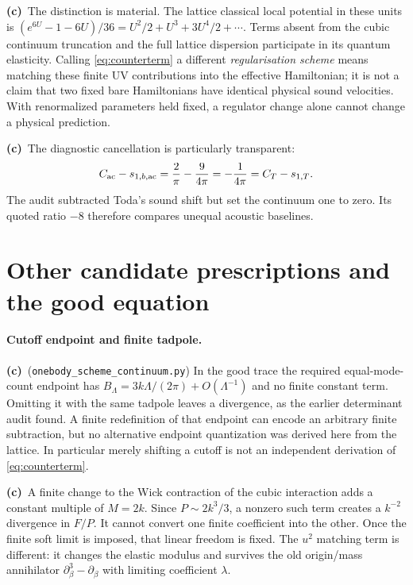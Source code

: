 \documentclass[11pt,a4paper]{article}
\newcommand{\Lc}{\textbf{(c)}\ }
\newcommand{\ccheck}{\texttt{onebody\_\allowbreak scheme\_\allowbreak continuum.py}}
\begin{document}
\Lc The distinction is material. The lattice classical local potential
in these units is
$(e^{6U}-1-6U)/36=U^2/2+U^3+3U^4/2+\cdots$.
Terms absent from the cubic continuum truncation and the full lattice
dispersion participate in its quantum elasticity. Calling
\eqref{eq:counterterm} a different \emph{regularisation scheme} means
matching these finite UV contributions into the effective Hamiltonian;
it is not a claim that two fixed bare Hamiltonians have identical physical
sound velocities. With renormalized parameters held fixed, a regulator
change alone cannot change a physical prediction.

\Lc The diagnostic cancellation is particularly transparent:
\begin{equation}\label{eq:soundsubtract}
 C_{\rm ac}-s_{1,b,\rm ac}
 =\frac2\pi-\frac9{4\pi}=-\frac1{4\pi}
 =C_T-s_{1,T}.
\end{equation}
The audit subtracted Toda's sound shift but set the continuum one to zero.
Its quoted ratio $-8$ therefore compares unequal acoustic baselines.

\section{Other candidate prescriptions and the good equation}
\paragraph{Cutoff endpoint and finite tadpole.}
\Lc (\ccheck) In the good trace the required equal-mode-count endpoint
has $B_\Lambda=3k\Lambda/(2\pi)+O(\Lambda^{-1})$ and no finite constant
term. Omitting it with the same tadpole leaves a divergence, as the earlier
determinant audit found. A finite redefinition of that endpoint can encode
an arbitrary finite subtraction, but no alternative endpoint quantization
was derived here from the lattice. In particular merely shifting a cutoff
is not an independent derivation of \eqref{eq:counterterm}.

\Lc A finite change to the Wick contraction of the cubic interaction
adds a constant multiple of $M=2k$. Since $P\sim2k^3/3$, a nonzero such
term creates a $k^{-2}$ divergence in $F/P$. It cannot convert one finite
coefficient into the other. Once the finite soft limit is imposed, that
linear freedom is fixed. The $u^2$ matching term is different: it changes
the elastic modulus and survives the old origin/mass annihilator
$\partial_\beta^3-\partial_\beta$ with limiting coefficient $\lambda$.
\end{document}
